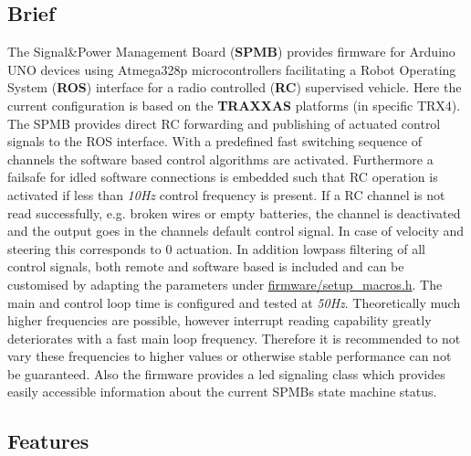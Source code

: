 \subsection*{Brief}

The Signal\&Power Management Board ({\bfseries S\+P\+MB}) provides firmware for Arduino U\+NO devices using Atmega328p microcontrollers facilitating a Robot Operating System ({\bfseries R\+OS}) interface for a radio controlled ({\bfseries RC}) supervised vehicle. Here the current configuration is based on the {\bfseries T\+R\+A\+X\+X\+AS} platforms (in specific T\+R\+X4). The S\+P\+MB provides direct RC forwarding and publishing of actuated control signals to the R\+OS interface. With a predefined fast switching sequence of channels the software based control algorithms are activated. Furthermore a failsafe for idled software connections is embedded such that RC operation is activated if less than {\itshape 10\+Hz} control frequency is present. If a RC channel is not read successfully, e.\+g. broken wires or empty batteries, the channel is deactivated and the output goes in the channels default control signal. In case of velocity and steering this corresponds to 0 actuation. In addition lowpass filtering of all control signals, both remote and software based is included and can be customised by adapting the parameters under {\ttfamily \hyperlink{setup__macros_8h_source}{firmware/setup\+\_\+macros.\+h}}. The main and control loop time is configured and tested at {\itshape 50\+Hz}. Theoretically much higher frequencies are possible, however interrupt reading capability greatly deteriorates with a fast main loop frequency. Therefore it is recommended to not vary these frequencies to higher values or otherwise stable performance can not be guaranteed. Also the firmware provides a led signaling class which provides easily accessible information about the current S\+P\+MB\textquotesingle{}s state machine status.

\subsection*{Features}


